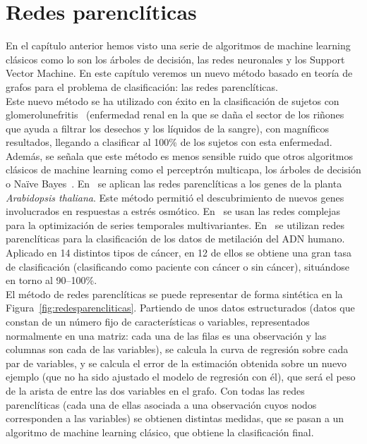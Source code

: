 \chapter{Redes parenclíticas}\label{cap:redes_parencliticas}

En el capítulo anterior hemos visto una serie de algoritmos de machine learning clásicos como lo son los árboles de decisión, las redes neuronales y los Support Vector Machine. En este capítulo veremos un nuevo método basado en teoría de grafos para el problema de clasificación: las redes parenclíticas.\\

Este nuevo método se ha utilizado con éxito en la clasificación de sujetos con glomerolunefritis~\cite{metabo3010155, 1304.1896} (enfermedad renal en la que se daña el sector de los riñones que ayuda a filtrar los desechos y los líquidos de la sangre), con magníficos resultados, llegando a clasificar al 100\% de los sujetos con esta enfermedad. Además, se señala que este método es menos sensible ruido que otros algoritmos clásicos de machine learning como el perceptrón multicapa, los árboles de decisión o Naïve Bayes~\cite{metabo3010155}. En~\cite{Zanin2014} se aplican las redes parenclíticas a los genes de la planta \textit{Arabidopsis thaliana}. Este método permitió el descubrimiento de nuevos genes involucrados en respuestas a estrés osmótico. En~\cite{Zanin2012} se usan las redes complejas para la optimización de series temporales multivariantes. En~\cite{1506.04421} se utilizan redes parenclíticas para la clasificación de los datos de metilación del ADN humano. Aplicado en 14 distintos tipos de cáncer, en 12 de ellos se obtiene una gran tasa de clasificación (clasificando como paciente con cáncer o sin cáncer), situándose en torno al 90--100\%.\\

El método de redes parenclíticas se puede representar de forma sintética en la Figura~\ref{fig:redesparencliticas}. Partiendo de unos datos estructurados (datos que constan de un número fijo de características o variables, representados normalmente en una matriz: cada una de las filas es una observación y las columnas son cada de las variables), se calcula la curva de regresión sobre cada par de variables, y se calcula el error de la estimación obtenida sobre un nuevo ejemplo (que no ha sido ajustado el modelo de regresión con él), que será el peso de la arista de entre las dos variables en el grafo. Con todas las redes parenclíticas (cada una de ellas asociada a una observación cuyos nodos corresponden a las variables) se obtienen distintas medidas, que se pasan a un algoritmo de machine learning clásico, que obtiene la clasificación final.     

